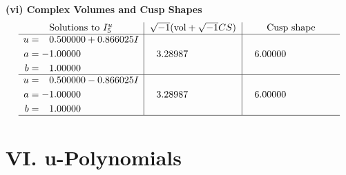 \documentclass[1p]{elsarticle_modified}
\theoremstyle{definition}
\newcommand{\I}{\sqrt{-1}}
\begin{document}
\newpage\flushleft \textbf{(vi) Complex Volumes and Cusp Shapes}
$$\begin{array}{c|c|c}  
\text{Solutions to }I^u_{5}& \I (\text{vol} + \sqrt{-1}CS) & \text{Cusp shape}\\
 \hline 
\begin{aligned}
u &= \phantom{-}0.500000 + 0.866025 I \\
a &= -1.00000\phantom{ +0.000000I} \\
b &= \phantom{-}1.00000\phantom{ +0.000000I}\end{aligned}
 & \phantom{-}3.28987\phantom{ +0.000000I} & \phantom{-}6.00000\phantom{ +0.000000I} \\ \hline\begin{aligned}
u &= \phantom{-}0.500000 - 0.866025 I \\
a &= -1.00000\phantom{ +0.000000I} \\
b &= \phantom{-}1.00000\phantom{ +0.000000I}\end{aligned}
 & \phantom{-}3.28987\phantom{ +0.000000I} & \phantom{-}6.00000\phantom{ +0.000000I}\\
 \hline 
 \end{array}$$\newpage
\newpage\renewcommand{\arraystretch}{1}
\centering \section*{ VI. u-Polynomials}
\end{document}
